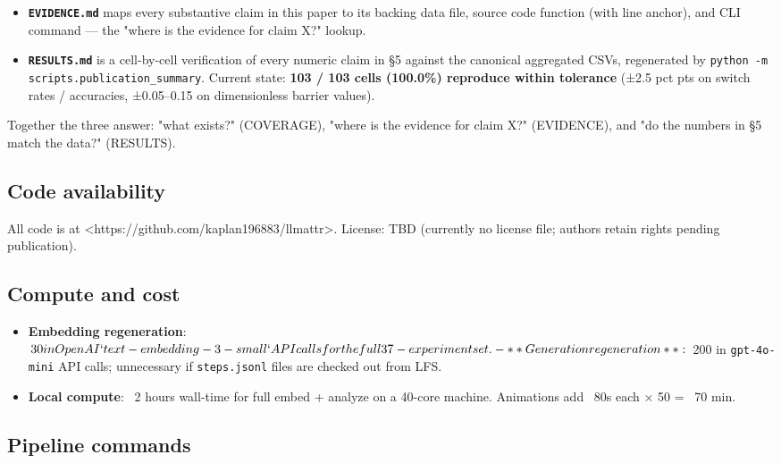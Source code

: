 \documentclass{article}
\theoremstyle{plain}
\theoremstyle{definition}
\begin{document}
\begin{itemize}
  \item \textbf{\texttt{EVIDENCE.md}} maps every substantive claim in this paper to its
  backing data file, source code function (with line anchor), and CLI
  command — the "where is the evidence for claim X?" lookup.
  \item \textbf{\texttt{RESULTS.md}} is a cell-by-cell verification of every numeric
  claim in §5 against the canonical aggregated CSVs, regenerated by
  \texttt{python -m scripts.publication\_summary}. Current state:
  \textbf{103 / 103 cells (100.0\%) reproduce within tolerance} (±2.5 pct
  pts on switch rates / accuracies, ±0.05–0.15 on dimensionless
  barrier values).
\end{itemize}

Together the three answer: "what exists?" (COVERAGE), "where is the
evidence for claim X?" (EVIDENCE), and "do the numbers in §5 match
the data?" (RESULTS).

\subsection{Code availability}

All code is at <https://github.com/kaplan196883/llmattr>. License:
TBD (currently no license file; authors retain rights pending
publication).

\subsection{Compute and cost}

\begin{itemize}
  \item \textbf{Embedding regeneration}: ~$30 in OpenAI `text-embedding-3-small`
  API calls for the full 37-experiment set.
- **Generation regeneration**: ~$200 in \texttt{gpt-4o-mini} API calls;
  unnecessary if \texttt{steps.jsonl} files are checked out from LFS.
  \item \textbf{Local compute}: ~2 hours wall-time for full embed + analyze on a
  40-core machine. Animations add ~80s each × 50 = ~70 min.
\end{itemize}

\subsection{Pipeline commands}
\end{document}
